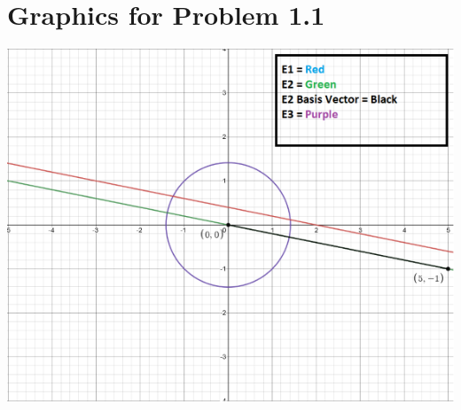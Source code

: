 \documentclass{article}
\begin{document}
\break
\section{Graphics for Problem 1.1}
\includegraphics{Figure1.png}
\end{document}
